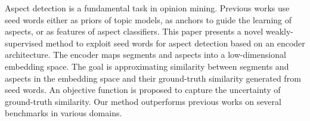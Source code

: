 Aspect detection is a fundamental task in opinion mining. Previous works use seed words either as priors of topic models, as anchors to guide the learning of aspects, or as features of aspect classifiers. This paper presents a novel weakly-supervised method to exploit seed words for aspect detection based on an encoder architecture. The encoder maps segments and aspects into a low-dimensional embedding space. The goal is approximating similarity between segments and aspects in the embedding space and their ground-truth similarity generated from seed words. An objective function is proposed to capture the uncertainty of ground-truth similarity. Our method outperforms previous works on several benchmarks in various domains.
